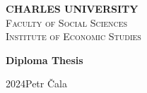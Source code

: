 \documentclass [a4paper,12pt]{report}
\def \BookName {Diploma Thesis}
\def \AutorDP {Petr \v{C}ala}
\def \Year {2024}
\def \CUNI {CHARLES UNIVERSITY}
\def \FSS {Faculty of Social Sciences}
\def \IES {Institute of Economic Studies}
\begin{document}
\pagestyle{empty}

    \begin{center}
    {\LARGE \textbf{\CUNI}}\\[2ex]
    {\LARGE \textsc{\FSS}}\\[1ex]
 	  {\large \textsc{\IES}}

		\vspace{8.47cm}
		
    {\Huge \textbf{\BookName} \\[4ex]

    }

    \vfill

    {\Large \Year \hfill \AutorDP}\\[6ex]

    \newpage
    \end{center}
\end{document}
